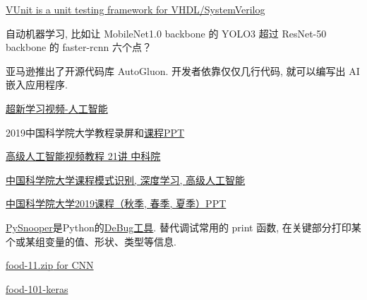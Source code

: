 \href{http://vunit.github.io/}{VUnit is a unit testing framework for VHDL/SystemVerilog}

自动机器学习, 比如让 MobileNet1.0 backbone 的 YOLO3 超过 ResNet-50 backbone 的 faster-rcnn 六个点？

亚马逊推出了开源代码库 AutoGluon. 开发者依靠仅仅几行代码, 就可以编写出 AI 嵌入应用程序.

\href{https://www.bilibili.com/video/av33395309/}{超新学习视频-人工智能}

2019中国科学院大学教程录屏和\href{https://github.com/HuangCongQing/UCAS_Course_2019}{课程PPT}

\href{https://www.iqiyi.com/v_19rr1o847g.html#curid=1148884000_8c04c5033512842cb378be129ace634e}{高级人工智能视频教程 21讲 中科院}

\href{https://github.com/univeryinli/ucas-ppt}{中国科学院大学课程模式识别, 深度学习, 高级人工智能}

\href{https://github.com/zggl/UCAS_Course_2019}{中国科学院大学2019课程（秋季, 春季, 夏季）PPT}

\href{https://pypi.org/project/PySnooper/}{PySnooper}是Python的\href{https://github.com/cool-RR/PySnooper}{DeBug工具}. 替代调试常用的 print 函数, 在关键部分打印某个或某组变量的值、形状、类型等信息.

\href{https://drive.google.com/uc?id=19CzXudqN58R3D-1G8KeFWk8UDQwlb8is}{\href{https://drive.google.com/drive/my-drive}{food-11.zip} for CNN}

\href{https://github.com/zggl/food-101-keras}{food-101-keras}

